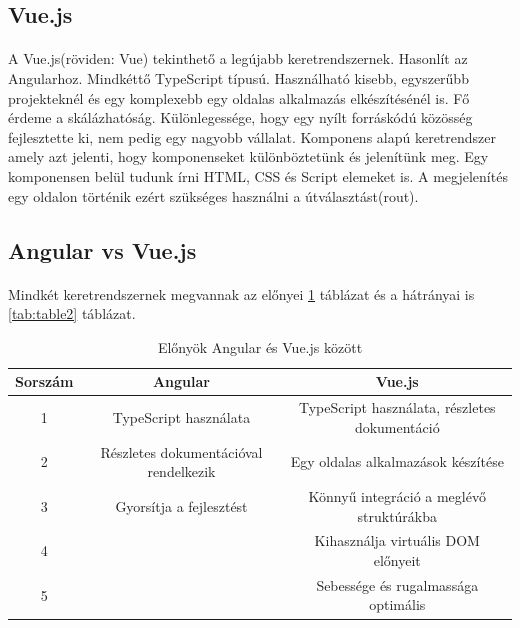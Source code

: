 	\subsection{Vue.js}
	\paragraph{}
	A Vue.js(röviden: Vue) tekinthető a legújabb keretrendszernek. Hasonlít az Angularhoz. Mindkéttő TypeScript típusú. Használható kisebb, egyszerűbb projekteknél és egy komplexebb egy oldalas alkalmazás elkészítésénél is. Fő érdeme a skálázhatóság. Különlegessége, hogy egy nyílt forráskódú közösség fejlesztette ki, nem pedig egy nagyobb vállalat. Komponens alapú keretrendszer amely azt jelenti, hogy komponenseket különböztetünk és jelenítünk meg. Egy komponensen belül tudunk írni HTML, CSS és Script elemeket is. A megjelenítés egy oldalon történik ezért szükséges használni a útválasztást(rout).\cite{wohlgethan2018supportingweb}
	
	\subsection{Angular vs Vue.js}
	\paragraph{}
	Mindkét keretrendszernek megvannak az előnyei \ref{tab:table1} táblázat és a hátrányai is \ref{tab:table2} táblázat. 
	\begin{table}
		\begin{center}
			\caption{Előnyök Angular és Vue.js között \cite{vuevsang} }
			\label{tab:table1}
			\begin{tabular}{c|c|c} 
				\textbf{Sorszám} & \textbf{Angular} & \textbf{Vue.js}\\
				\hline
				1 & TypeScript használata & TypeScript használata, részletes dokumentáció\\
				\hline
				2 & Részletes dokumentációval rendelkezik & Egy oldalas alkalmazások készítése \\
				\hline
				3 & Gyorsítja a fejlesztést & Könnyű integráció a meglévő struktúrákba \\
				\hline
				4 & & Kihasználja virtuális DOM előnyeit \\
				\hline
				5 & & Sebessége és rugalmassága optimális \\
			\end{tabular}
		\end{center}
	\end{table}

